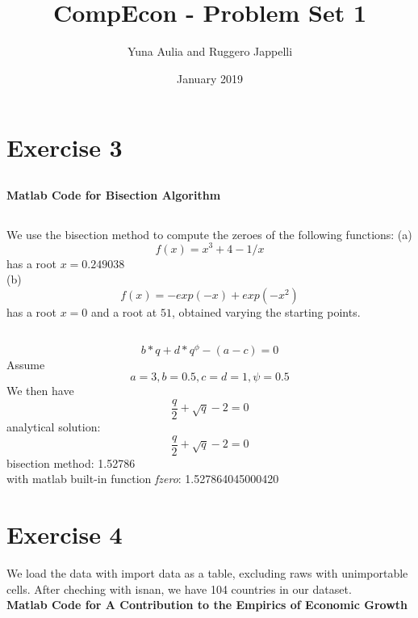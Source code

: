 \documentclass{article}
\title{CompEcon - Problem Set 1}
\author{Yuna Aulia and Ruggero Jappelli}
\date{January 2019}
\begin{document}
\maketitle



\section{Exercise 3}
\subsection{}
\textbf{Matlab Code for Bisection Algorithm}

\subsection{}
We use the bisection method to compute the zeroes of the following functions:
(a) $$f(x) = x^3 + 4 - 1/x$$ has a root $x = 0.249038$\\

(b) $$f(x) = -exp(-x) + exp(-x^2) $$ has a root $x = 0$ and a root at $51$, obtained varying the starting points.

\subsection{}
$$b * q + d * q^\phi - (a - c) = 0 $$
Assume $$ a = 3, b = 0.5, c = d = 1, \psi = 0.5$$
We then have $$ \dfrac{q}{2} + \sqrt{q} -2 = 0 $$
  analytical solution:   \\
$$ \dfrac{q}{2} + \sqrt{q} -2 = 0 $$
  bisection method: 1.52786 \\
  with matlab built-in function \textit{fzero}: 1.527864045000420 \\
  
  
  \section{Exercise 4}
  
  We load the data with import data as a table, excluding raws with unimportable cells. After cheching with isnan, we have 104 countries in our dataset.\\
  \textbf{Matlab Code for A Contribution to the Empirics of Economic Growth}


  \\
  \\
  
\end{document}
